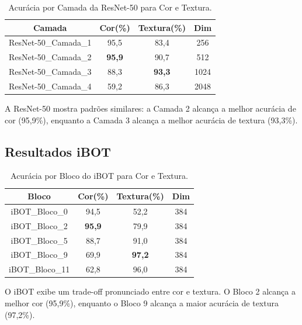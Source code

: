\documentclass[conference]{IEEEtran}
\begin{document}
\begin{table}[htbp]
\caption{Acurácia por Camada da ResNet-50 para Cor e Textura.}
\begin{center}
\begin{tabular}{|c|c|c|c|}
\hline
\textbf{Camada} & \textbf{Cor(\%)} & \textbf{Textura(\%)} & \textbf{Dim}\\
\hline
ResNet-50\_Camada\_1 & 95,5 & 83,4 & 256 \\
\hline
ResNet-50\_Camada\_2 & \textbf{95,9} & 90,7 & 512 \\
\hline
ResNet-50\_Camada\_3 & 88,3 & \textbf{93,3} & 1024 \\
\hline
ResNet-50\_Camada\_4 & 59,2 & 86,3 & 2048 \\
\hline
\end{tabular}
\label{tab2}
\end{center}
\end{table}

A ResNet-50 mostra padrões similares: a Camada 2 alcança a melhor acurácia de cor (95,9\%), enquanto a Camada 3 alcança a melhor acurácia de textura (93,3\%).

\subsection{Resultados iBOT}

\begin{table}[htbp]
\caption{Acurácia por Bloco do iBOT para Cor e Textura.}
\begin{center}
\begin{tabular}{|c|c|c|c|}
\hline
\textbf{Bloco} & \textbf{Cor(\%)} & \textbf{Textura(\%)} & \textbf{Dim}\\
\hline
iBOT\_Bloco\_0 & 94,5 & 52,2 & 384 \\
\hline
iBOT\_Bloco\_2 & \textbf{95,9} & 79,9 & 384 \\
\hline
iBOT\_Bloco\_5 & 88,7 & 91,0 & 384 \\
\hline
iBOT\_Bloco\_9 & 69,9 & \textbf{97,2} & 384 \\
\hline
iBOT\_Bloco\_11 & 62,8 & 96,0 & 384 \\
\hline
\end{tabular}
\label{tab3}
\end{center}
\end{table}

O iBOT exibe um trade-off pronunciado entre cor e textura. O Bloco 2 alcança a melhor cor (95,9\%), enquanto o Bloco 9 alcança a maior acurácia de textura (97,2\%).
\end{document}
